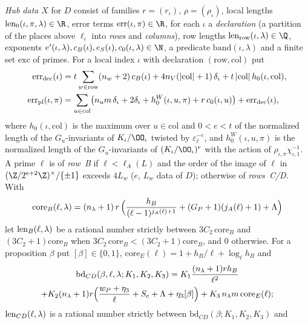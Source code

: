 \begin{definition}\label{pf:linkN-adm:def-hub}
\emph{Hub data} $X$ for $D$ consist of families $r=(r_\iota)$, $\rho=(\rho_\iota)$, local lengths
$\linkNadmlen_0(\iota,\pi,\lambda)\in\R$, error terms $\linkNadmerr(\iota,\pi)\in\R$, for each $\iota$ a
\emph{declaration} (a partition of the places above $\ell_\iota$ into \emph{rows} and \emph{columns}), row lengths
$\linkNadmlen_{\mathrm{row}}(\iota,\lambda)\in\Q$, exponents $e'(\iota,\lambda),c_B(\iota),e_S(\iota),c_0(\iota,\lambda)\in\N$,
a predicate $\mathrm{band}(\iota,\lambda)$ and a finite set $\mathrm{exc}$ of primes. For a local index $\iota$ with
declaration $(\mathrm{row},\mathrm{col})$ put
\begin{align*}
\operatorname{err}_{\mathrm{dec}}(\iota)&=t\sum_{w\in\mathrm{row}}(n_w+2)\,c_B(\iota)+4n_V(|\mathrm{col}|+1)\,\delta_\iota
+t\,|\mathrm{col}|\,h_0(\iota,\mathrm{col}),\\
\operatorname{err}_{\mathrm{pl}}(\iota,\pi)&=\sum_{u\in\mathrm{col}}\bigl(n_u m\,\delta_\iota+2\delta_\iota+h^W_0(\iota,u,\pi)
+r\,c_0(\iota,u)\bigr)+\operatorname{err}_{\mathrm{dec}}(\iota),
\end{align*}
where $h_0(\iota,\mathrm{col})$ is the maximum over $u\in\mathrm{col}$ and $0<e<t$ of the normalized length of the
$G_u$-invariants of $K_\iota/\OO_\iota$ twisted by $\varepsilon_\ell^{-e}$, and $h^W_0(\iota,u,\pi)$ is the normalized
length of the $G_u$-invariants of $(K_\iota/\OO_\iota)^r$ with the action of $\rho_{\iota,\pi}\chi_{\iota,1}^{-1}$. A prime
$\ell$ is of \emph{row~B} if $\ell<\ell_A(L)$ and the order of the image of $\ell$ in $(\Z/2^{e+2}\Z)^\times/\{\pm1\}$
exceeds $4L_w$ ($e$, $L_w$ data of $D$); otherwise of \emph{rows~C/D}. With
\[
\mathrm{core}_B(\ell,\lambda)=(n_\lambda+1)\,r\,\Bigl(\frac{h_B}{(\ell-1)^{j_A(\ell)+1}}+(G_P+1)(j_A(\ell)+1)+\Lambda\Bigr)
\]
let $\operatorname{len}_B(\ell,\lambda)$ be a rational number strictly between $3C_2\,\mathrm{core}_B$ and
$(3C_2+1)\mathrm{core}_B$ when $3C_2\,\mathrm{core}_B<(3C_2+1)\mathrm{core}_B$, and $0$ otherwise. For a proposition
$\beta$ put
$[\beta]\in\{0,1\}$, $\mathrm{core}_E(\ell)=1+h_B/\ell+\log_\ell h_B$ and
\begin{multline}\label{pf:linkN-adm:eq-bdCD}
\mathrm{bd}_{CD}(\beta,\ell,\lambda;K_1,K_2,K_3)=K_1\frac{(n_\lambda+1)rh_B}{\ell^2}\\
+K_2(n_\lambda+1)r\Bigl(\frac{w_P+\eta_3}{\ell}+S_c+\Lambda+\eta_3[\beta]\Bigr)+K_3\,n_\lambda m\,\mathrm{core}_E(\ell);
\end{multline}
$\operatorname{len}_{CD}(\ell,\lambda)$ is a rational number strictly between $\mathrm{bd}_{CD}(\beta;K_1,K_2,K_3)$ and

\end{definition}

